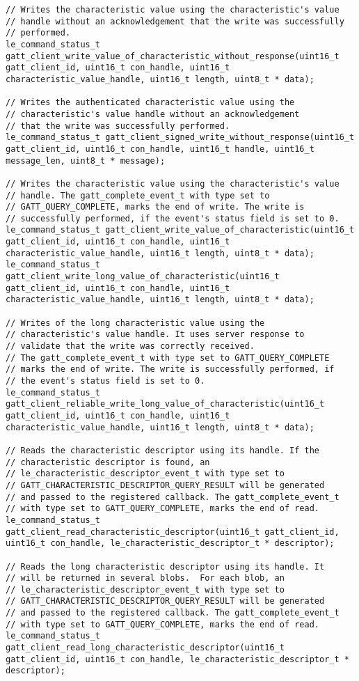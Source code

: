 \begin{lstlisting}
// Writes the characteristic value using the characteristic's value
// handle without an acknowledgement that the write was successfully
// performed.
le_command_status_t gatt_client_write_value_of_characteristic_without_response(uint16_t gatt_client_id, uint16_t con_handle, uint16_t characteristic_value_handle, uint16_t length, uint8_t * data);

// Writes the authenticated characteristic value using the
// characteristic's value handle without an acknowledgement
// that the write was successfully performed.
le_command_status_t gatt_client_signed_write_without_response(uint16_t gatt_client_id, uint16_t con_handle, uint16_t handle, uint16_t message_len, uint8_t * message);

// Writes the characteristic value using the characteristic's value
// handle. The gatt_complete_event_t with type set to
// GATT_QUERY_COMPLETE, marks the end of write. The write is
// successfully performed, if the event's status field is set to 0.
le_command_status_t gatt_client_write_value_of_characteristic(uint16_t gatt_client_id, uint16_t con_handle, uint16_t characteristic_value_handle, uint16_t length, uint8_t * data);
le_command_status_t gatt_client_write_long_value_of_characteristic(uint16_t gatt_client_id, uint16_t con_handle, uint16_t characteristic_value_handle, uint16_t length, uint8_t * data);

// Writes of the long characteristic value using the
// characteristic's value handle. It uses server response to
// validate that the write was correctly received.
// The gatt_complete_event_t with type set to GATT_QUERY_COMPLETE
// marks the end of write. The write is successfully performed, if
// the event's status field is set to 0.
le_command_status_t gatt_client_reliable_write_long_value_of_characteristic(uint16_t gatt_client_id, uint16_t con_handle, uint16_t characteristic_value_handle, uint16_t length, uint8_t * data);

// Reads the characteristic descriptor using its handle. If the
// characteristic descriptor is found, an
// le_characteristic_descriptor_event_t with type set to
// GATT_CHARACTERISTIC_DESCRIPTOR_QUERY_RESULT will be generated
// and passed to the registered callback. The gatt_complete_event_t
// with type set to GATT_QUERY_COMPLETE, marks the end of read.
le_command_status_t gatt_client_read_characteristic_descriptor(uint16_t gatt_client_id, uint16_t con_handle, le_characteristic_descriptor_t * descriptor);

// Reads the long characteristic descriptor using its handle. It
// will be returned in several blobs.  For each blob, an
// le_characteristic_descriptor_event_t with type set to
// GATT_CHARACTERISTIC_DESCRIPTOR_QUERY_RESULT will be generated
// and passed to the registered callback. The gatt_complete_event_t
// with type set to GATT_QUERY_COMPLETE, marks the end of read.
le_command_status_t gatt_client_read_long_characteristic_descriptor(uint16_t gatt_client_id, uint16_t con_handle, le_characteristic_descriptor_t * descriptor);


\end{lstlisting}
